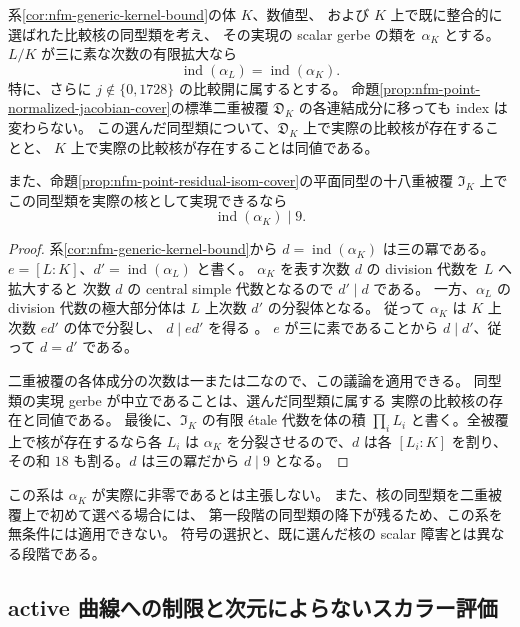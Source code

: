 \begin{corollary}
\label{cor:nfm-kernel-prime-to-three-invariance}
系\ref{cor:nfm-generic-kernel-bound}の体 $K$、数値型、
および $K$ 上で既に整合的に選ばれた比較核の同型類を考え、
その実現の scalar gerbe の類を $\alpha_K$ とする。
$L/K$ が三に素な次数の有限拡大なら
\[
 \operatorname{ind}(\alpha_L)=\operatorname{ind}(\alpha_K).
\]
特に、さらに $j\notin\{0,1728\}$ の比較開に属するとする。
命題\ref{prop:nfm-point-normalized-jacobian-cover}の標準二重被覆
$\mathfrak D_K$ の各連結成分に移っても index は変わらない。
この選んだ同型類について、$\mathfrak D_K$ 上で実際の比較核が存在することと、
$K$ 上で実際の比較核が存在することは同値である。

また、命題\ref{prop:nfm-point-residual-isom-cover}の平面同型の十八重被覆
$\mathfrak I_K$ 上でこの同型類を実際の核として実現できるなら
\[
 \operatorname{ind}(\alpha_K)\mid9.
\]
\end{corollary}

\begin{proof}
系\ref{cor:nfm-generic-kernel-bound}から
$d=\operatorname{ind}(\alpha_K)$ は三の冪である。
$e=[L:K]$、$d'=\operatorname{ind}(\alpha_L)$ と書く。
$\alpha_K$ を表す次数 $d$ の division 代数を $L$ へ拡大すると
次数 $d$ の central simple 代数となるので $d'\mid d$ である。
一方、$\alpha_L$ の division 代数の極大部分体は
$L$ 上次数 $d'$ の分裂体となる。
従って $\alpha_K$ は $K$ 上次数 $ed'$ の体で分裂し、
$d\mid ed'$ を得る
\cite[Lemmas~11.7.4, 11.8.3--11.8.4]{NFMStacksSplitting}。
$e$ が三に素であることから $d\mid d'$、従って $d=d'$ である。

二重被覆の各体成分の次数は一または二なので、この議論を適用できる。
同型類の実現 gerbe が中立であることは、選んだ同型類に属する
実際の比較核の存在と同値である。
最後に、$\mathfrak I_K$ の有限 étale 代数を体の積
$\prod_i L_i$ と書く。全被覆上で核が存在するなら各 $L_i$ は
$\alpha_K$ を分裂させるので、$d$ は各 $[L_i:K]$ を割り、
その和 $18$ も割る。$d$ は三の冪だから $d\mid9$ となる。
\end{proof}

この系は $\alpha_K$ が実際に非零であるとは主張しない。
また、核の同型類を二重被覆上で初めて選べる場合には、
第一段階の同型類の降下が残るため、この系を無条件には適用できない。
符号の選択と、既に選んだ核の scalar 障害とは異なる段階である。


\subsection{active 曲線への制限と次元によらないスカラー評価}


